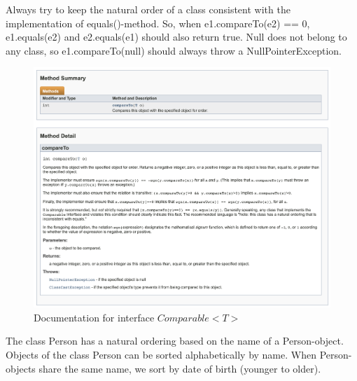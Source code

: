 Always try to keep the natural order of a class consistent with the implementation of equals()-method.  So, when e1.compareTo(e2) == 0, e1.equals(e2) and e2.equals(e1) should also return true.  Null does not belong to any class, so e1.compareTo(null) should always throw a NullPointerException.

\begin{figure}[H]
\includegraphics[width=\linewidth]{images/generics/javadoc_compareTo.png}
\caption{Documentation for interface $Comparable<T>$}
\label{fig:core_classes}
\end{figure}

The class Person has a natural ordering based on the name of a Person-object.  Objects of the class Person can be sorted alphabetically by name. When Person-objects share the same name, we sort by date of birth (younger to older).

